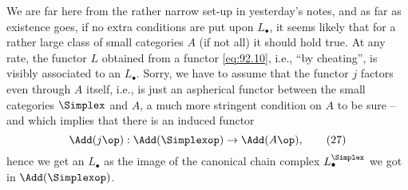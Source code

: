 We are far here from the rather narrow set-up in yesterday's notes,
and as far as existence goes, if no extra conditions are put upon
$L_\bullet$, it seems likely that for a rather large class of small
categories $A$ (if not all) it should hold true. At any rate, the
functor $L$ obtained from a functor \eqref{eq:92.10}, i.e., ``by
cheating'', is visibly associated to an $L_\bullet$. Sorry, we have to
assume that the functor $j$ factors even through $A$ itself, i.e., is
just an aspherical functor between the small categories $\Simplex$ and
$A$, a much more stringent condition on $A$ to be sure -- and which
implies that there is an induced functor
\begin{equation}
  \label{eq:92.27}
  \Add(j\op):\Add(\Simplexop)\to\Add(A\op),\tag{27}
\end{equation}
hence we get an $L_\bullet$ as the image of the canonical chain
complex $L_\bullet^\Simplex$ we got in $\Add(\Simplexop)$.

\bigbreak
\noindent\hfill{}\par

